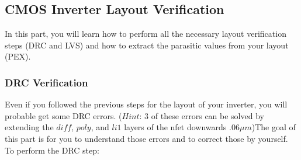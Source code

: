 \clearpage
\subsection{CMOS Inverter Layout Verification}
In this part, you will learn how to perform all the necessary layout verification steps (DRC and LVS) and how to extract the parasitic values from your layout (PEX).
\subsubsection{DRC Verification}
Even if you followed the previous steps for the layout of your inverter, you will probable get some DRC errors. ($Hint$: 3 of these errors can be solved by extending the $diff$, $poly$, and $li1$ layers of the nfet downwards $.06 \mu m$)The goal of this part is for you to understand those errors and to correct those by yourself. To perform the DRC step:
